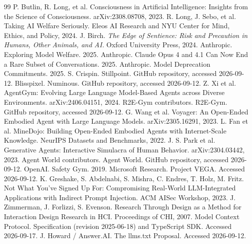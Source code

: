 \documentclass{arxiv-neurips-single}
\begin{document}
\begin{thebibliography}{99}\small
{} P. Butlin, R. Long, et al. Consciousness in Artificial Intelligence: Insights from the Science of Consciousness. arXiv:2308.08708, 2023.
 R. Long, J. Sebo, et al. Taking AI Welfare Seriously. Eleos AI Research and NYU Center for Mind, Ethics, and Policy, 2024.
 J. Birch. \emph{The Edge of Sentience: Risk and Precaution in Humans, Other Animals, and AI.} Oxford University Press, 2024.
 Anthropic. Exploring Model Welfare. 2025.
 Anthropic. Claude Opus 4 and 4.1 Can Now End a Rare Subset of Conversations. 2025.
 Anthropic. Model Deprecation Commitments. 2025.
 S. Crispin. Stillpoint. GitHub repository, accessed 2026-09-12.
 Blisspixel. Numinous. GitHub repository, accessed 2026-09-12.
 Z. Xi et al. AgentGym: Evolving Large Language Model-Based Agents across Diverse Environments. arXiv:2406.04151, 2024.
 R2E-Gym contributors. R2E-Gym. GitHub repository, accessed 2026-09-12.
 G. Wang et al. Voyager: An Open-Ended Embodied Agent with Large Language Models. arXiv:2305.16291, 2023.
 L. Fan et al. MineDojo: Building Open-Ended Embodied Agents with Internet-Scale Knowledge. NeurIPS Datasets and Benchmarks, 2022.
 J. S. Park et al. Generative Agents: Interactive Simulacra of Human Behavior. arXiv:2304.03442, 2023.
 Agent World contributors. Agent World. GitHub repository, accessed 2026-09-12.
 OpenAI. Safety Gym. 2019.
 Microsoft Research. Project VEGA. Accessed 2026-09-12.
 K. Greshake, S. Abdelnabi, S. Mishra, C. Endres, T. Holz, M. Fritz. Not What You've Signed Up For: Compromising Real-World LLM-Integrated Applications with Indirect Prompt Injection. ACM AISec Workshop, 2023.
 J. Zimmerman, J. Forlizzi, S. Evenson. Research Through Design as a Method for Interaction Design Research in HCI. Proceedings of CHI, 2007.
 Model Context Protocol. Specification (revision 2025-06-18) and TypeScript SDK. Accessed 2026-09-17.
 J. Howard / Answer.AI. The llms.txt Proposal. Accessed 2026-09-12.
\end{thebibliography}
\end{document}
